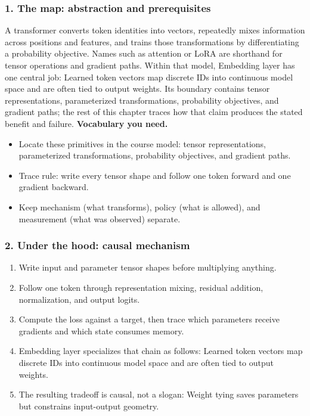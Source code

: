 \subsubsection*{1. The map: abstraction and prerequisites}
A transformer converts token identities into vectors, repeatedly mixes information across positions and features, and trains those transformations by differentiating a probability objective. Names such as attention or LoRA are shorthand for tensor operations and gradient paths.
Within that model, Embedding layer has one central job: Learned token vectors map discrete IDs into continuous model space and are often tied to output weights. Its boundary contains tensor representations, parameterized transformations, probability objectives, and gradient paths; the rest of this chapter traces how that claim produces the stated benefit and failure.
\textbf{Vocabulary you need.}\begin{itemize}
\item Locate these primitives in the course model: tensor representations, parameterized transformations, probability objectives, and gradient paths.
\item Trace rule: write every tensor shape and follow one token forward and one gradient backward.
\item Keep mechanism (what transforms), policy (what is allowed), and measurement (what was observed) separate.
\end{itemize}
\subsubsection*{2. Under the hood: causal mechanism}\begin{enumerate}
\item Write input and parameter tensor shapes before multiplying anything.
\item Follow one token through representation mixing, residual addition, normalization, and output logits.
\item Compute the loss against a target, then trace which parameters receive gradients and which state consumes memory.
\item Embedding layer specializes that chain as follows: Learned token vectors map discrete IDs into continuous model space and are often tied to output weights.
\item The resulting tradeoff is causal, not a slogan: Weight tying saves parameters but constrains input-output geometry.
\end{enumerate}
